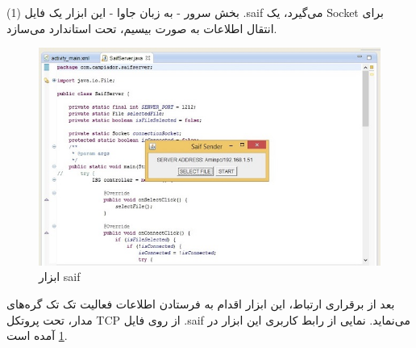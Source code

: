 \begin{itemize}
	(1) بخش سرور - به زبان جاوا - این ابزار یک فایل .saif می‌گیرد، یک Socket برای انتقال اطلاعات به صورت بیسیم، تحت استاندارد   می‌سازد.
	\begin{figure}
		\begin{center}
			\includegraphics[scale=0.9]{figs/saifServer.jpg}
			\caption{ابزار saif}
			\label{fig2}
		\end{center}
	\end{figure}
	بعد از برقراری ارتباط، این ابزار اقدام به فرستادن اطلاعات فعالیت تک تک گره‌های مدار، تحت پروتکل TCP از روی فایل .saif می‌نماید. نمایی از رابط کاربری این ابزار در \ref{fig2} آمده است.
	

\end{itemize}
